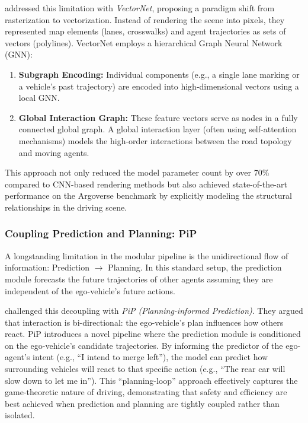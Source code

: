 \documentclass[12pt, a4paper]{article}
\begin{document}
\cite{gao2020vectornet} addressed this limitation with \textit{VectorNet}, proposing a paradigm shift from rasterization to vectorization. Instead of rendering the scene into pixels, they represented map elements (lanes, crosswalks) and agent trajectories as sets of vectors (polylines). VectorNet employs a hierarchical Graph Neural Network (GNN):
\begin{enumerate}
    \item \textbf{Subgraph Encoding:} Individual components (e.g., a single lane marking or a vehicle's past trajectory) are encoded into high-dimensional vectors using a local GNN.
    \item \textbf{Global Interaction Graph:} These feature vectors serve as nodes in a fully connected global graph. A global interaction layer (often using self-attention mechanisms) models the high-order interactions between the road topology and moving agents.
\end{enumerate}
This approach not only reduced the model parameter count by over 70\% compared to CNN-based rendering methods but also achieved state-of-the-art performance on the Argoverse benchmark by explicitly modeling the structural relationships in the driving scene.

\subsubsection{Coupling Prediction and Planning: PiP}
A longstanding limitation in the modular pipeline is the unidirectional flow of information: Prediction $\rightarrow$ Planning. In this standard setup, the prediction module forecasts the future trajectories of other agents assuming they are independent of the ego-vehicle's future actions.

\cite{song2020pip} challenged this decoupling with \textit{PiP (Planning-informed Prediction)}. They argued that interaction is bi-directional: the ego-vehicle's plan influences how others react. PiP introduces a novel pipeline where the prediction module is conditioned on the ego-vehicle's candidate trajectories. By informing the predictor of the ego-agent's intent (e.g., ``I intend to merge left''), the model can predict how surrounding vehicles will react to that specific action (e.g., ``The rear car will slow down to let me in''). This ``planning-loop'' approach effectively captures the game-theoretic nature of driving, demonstrating that safety and efficiency are best achieved when prediction and planning are tightly coupled rather than isolated.
\end{document}
